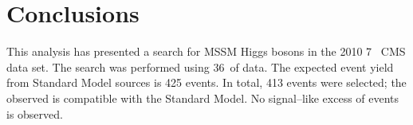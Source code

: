 \ifx\master\undefined\fi
%
\chapter{Conclusions}
\label{ch:conclusions}

This analysis has presented a search for MSSM Higgs bosons in the 2010 7~\TeV
CMS data set.  The search was performed using 36~\pbinv of data.  The expected
event yield from Standard Model sources is 425 events. In total, 413 events were
selected; the observed is compatible with the Standard Model.  No signal--like
excess of events is observed.  

\ifx\master\undefined\fi

